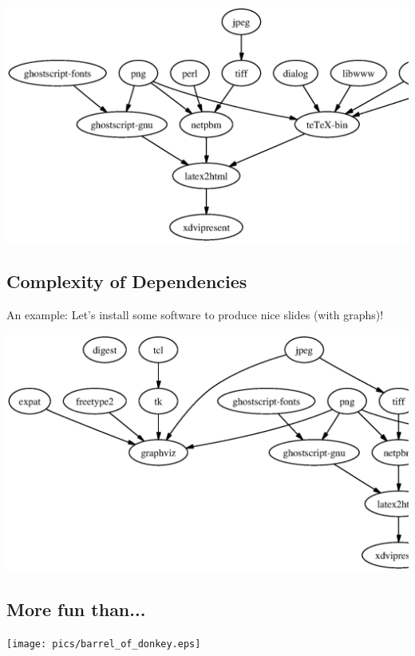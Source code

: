 \documentclass[xga]{xdvislides}
\begin{document}
\vspace*{\fill}
\begin{center}
	\includegraphics[scale=0.8]{pics/xdvipresent.3.ps}
\end{center}

\subsection{Complexity of Dependencies}
An example: Let's install some software to produce nice slides (with
graphs)! \\

\vspace*{\fill}
\begin{center}
	\includegraphics[scale=0.65]{pics/xdvipresent.graphviz.ps}
\end{center}


\subsection{More fun than...}
\vspace*{\fill}
\begin{center}
	\texttt{[image: pics/barrel\_of\_donkey.eps]}
\end{center}
\end{document}
